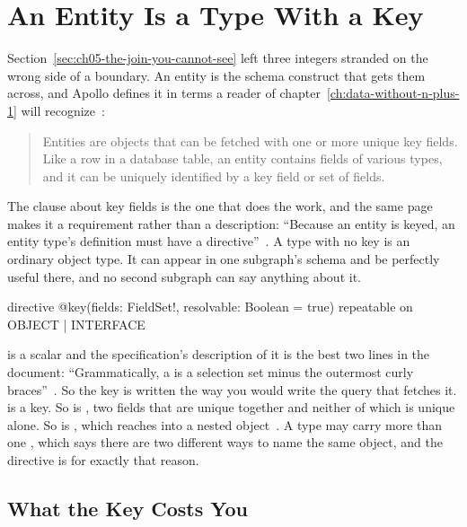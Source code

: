 \section{An Entity Is a Type With a Key}
\label{sec:ch05-an-entity-is-a-type-with-a-key}

%
Section~\ref{sec:ch05-the-join-you-cannot-see} left three integers stranded on
the wrong side of a boundary. An entity is the schema construct that gets them
across, and Apollo defines it in terms a reader of
chapter~\ref{ch:data-without-n-plus-1} will recognize~\autocite{apolloentities}:

\begin{quote}
Entities are objects that can be fetched with one or more unique key fields.
Like a row in a database table, an entity contains fields of various types, and
it can be uniquely identified by a key field or set of fields.
\end{quote}

%
The clause about key fields is the one that does the work, and the same page
makes it a requirement rather than a description: \enquote{Because an entity is
keyed, an entity type's definition must have a 
directive}~\autocite{apolloentities}. A type with no key is an ordinary object
type. It can appear in one subgraph's schema and be perfectly useful there, and
no second subgraph can say anything about it.

\begin{graphqlsdl}
directive @key(fields: FieldSet!, resolvable: Boolean = true)
  repeatable on OBJECT | INTERFACE
\end{graphqlsdl}

%
 is a scalar and the specification's description of it is the
best two lines in the document: \enquote{Grammatically, a  is a
selection set minus the outermost curly
braces}~\autocite{apollosubgraphspec}. So the key is written the way you would
write the query that fetches it.  is a key. So is
, two fields that are unique together and neither of
which is unique alone. So is , which reaches
into a nested object~\autocite{apollodirectives}. A type may carry more than
one , which says there are two different ways to name the same
object, and the directive is  for exactly that reason.

\subsection{What the Key Costs You}

